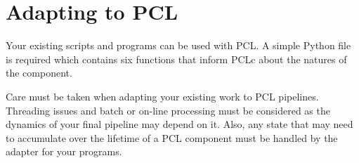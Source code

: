 \chapter{Adapting to PCL}
Your existing scripts and programs can be used with PCL. A simple Python file is required which contains six functions that inform PCLc about the natures of the component.

Care must be taken when adapting your existing work to PCL pipelines. Threading issues and batch or on-line processing must be considered as the dynamics of your final pipeline may depend on it. Also, any state that may need to accumulate over the lifetime of a PCL component must be handled by the adapter for your programs.